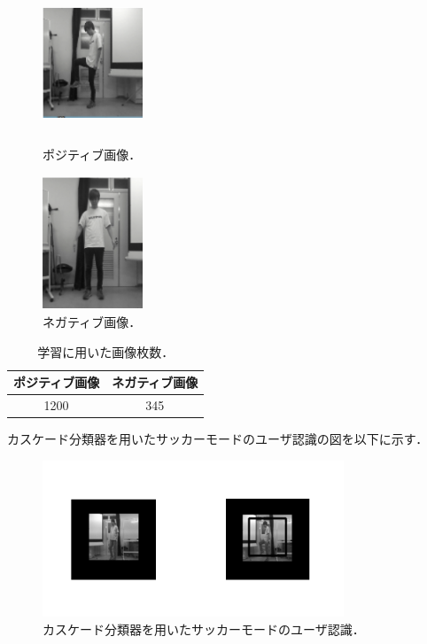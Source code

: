 \begin{figure}[h]
    \begin{minipage}{0.5\hsize}
     \begin{center}
      \includegraphics[width=3cm,height=4cm]{image/posi.png}
     \end{center}
     \caption[ポジティブ画像]{ポジティブ画像．}
     \label{posi}
    \end{minipage}
    \begin{minipage}{0.5\hsize}
     \begin{center}
      \includegraphics[width=3cm,height=4cm]{image/nega2.png}
     \end{center}
     \caption[ネガティブ画像]{ネガティブ画像．}
     \label{nega}
    \end{minipage}
\end{figure}

\vspace{1cm}

\begin{table}[htb]
    \centering
     \begin{tabular}{cc}	\hline
       ポジティブ画像 & ネガティブ画像 \\	\hline \hline
       1200 & 345 \\\hline
     \end{tabular}
    \caption[学習に用いた画像枚数]{学習に用いた画像枚数．}
  \end{table}


\clearpage
カスケード分類器を用いたサッカーモードのユーザ認識の図を以下に示す．

\vspace{1cm}


\begin{figure}[h]
  \centering
  \includegraphics[width=9cm]{image/ninshiki.png}
  \caption[カスケード分類器を用いたサッカーモードのユーザ認識]{カスケード分類器を用いたサッカーモードのユーザ認識．}
\label{lbpfig}
\end{figure}



